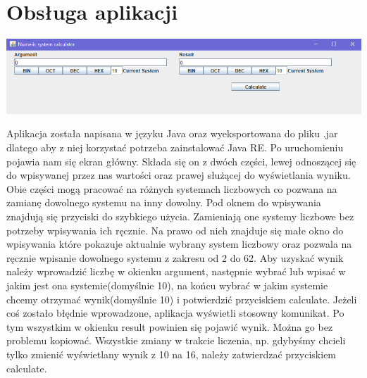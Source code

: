 \documentclass[11pt,a4paper]{article}
\begin{document}
\section{Obsługa aplikacji}
\begin{center}
\includegraphics[scale=0.4]{Aplication.png}
\end{center}
Aplikacja została napisana w języku Java oraz wyeksportowana do pliku .jar dlatego aby z niej korzystać potrzeba zainstalować Java RE. Po uruchomieniu pojawia nam się ekran główny. Składa się on z dwóch części, lewej odnoszącej się do wpisywanej przez nas wartości oraz prawej służącej do wyświetlania wyniku. Obie części mogą pracować na różnych systemach liczbowych co pozwana na zamianę dowolnego systemu na inny dowolny. Pod oknem do wpisywania znajdują się przyciski do szybkiego użycia. Zamieniają one systemy liczbowe bez potrzeby wpisywania ich ręcznie. Na prawo od nich znajduje się małe okno do wpisywania które pokazuje aktualnie wybrany system liczbowy oraz pozwala na ręcznie wpisanie dowolnego systemu z zakresu od 2 do 62. Aby uzyskać wynik należy wprowadzić liczbę w okienku argument, następnie wybrać lub wpisać w jakim jest ona systemie(domyślnie 10), na końcu wybrać w jakim systemie chcemy otrzymać wynik(domyślnie 10) i potwierdzić przyciskiem calculate. Jeżeli coś zostało błędnie wprowadzone, aplikacja wyświetli stosowny komunikat. Po tym wszystkim w okienku result powinien się pojawić wynik. Można go bez problemu kopiować. Wszystkie zmiany w trakcie liczenia, np. gdybyśmy chcieli tylko zmienić wyświetlany wynik z 10 na 16, należy zatwierdzać przyciskiem calculate.
\end{document}
